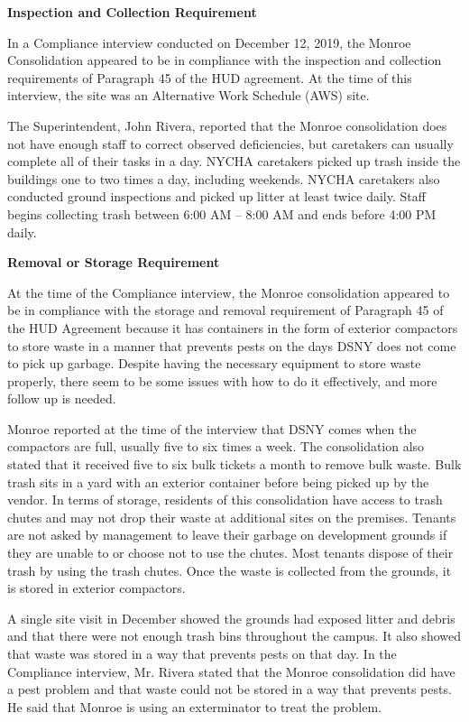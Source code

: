 
\textbf{Inspection and Collection Requirement} 

 

In a Compliance interview conducted on December 12, 2019, the Monroe Consolidation appeared to be in compliance with the inspection and collection requirements of Paragraph 45 of the HUD agreement. At the time of this interview, the site was an Alternative Work Schedule (AWS) site. 

The Superintendent, John Rivera, reported that the Monroe consolidation does not have enough staff to correct observed deficiencies, but caretakers can usually complete all of their tasks in a day. NYCHA caretakers picked up trash inside the buildings one to two times a day, including weekends. NYCHA caretakers also conducted ground inspections and picked up litter at least twice daily. Staff begins collecting trash between 6:00 AM -- 8:00 AM and ends before 4:00 PM daily.

\textbf{Removal or Storage Requirement} 

 

At the time of the Compliance interview, the Monroe consolidation appeared to be in compliance with the storage and removal requirement of Paragraph 45 of the HUD Agreement because it has containers in the form of exterior compactors to store waste in a manner that prevents pests on the days DSNY does not come to pick up garbage. Despite having the necessary equipment to store waste properly, there seem to be some issues with how to do it effectively, and more follow up is needed.

 

Monroe reported at the time of the interview that DSNY comes when the compactors are full, usually five to six times a week. The consolidation also stated that it received five to six bulk tickets a month to remove bulk waste. Bulk trash sits in a yard with an exterior container before being picked up by the vendor. In terms of storage, residents of this consolidation have access to trash chutes and may not drop their waste at additional sites on the premises. Tenants are not asked by management to leave their garbage on development grounds if they are unable to or choose not to use the chutes. Most tenants dispose of their trash by using the trash chutes. Once the waste is collected from the grounds, it is stored in exterior compactors. 

A single site visit in December showed the grounds had exposed litter and debris and that there were not enough trash bins throughout the campus. It also showed that waste was stored in a way that prevents pests on that day. In the Compliance interview, Mr. Rivera stated that the Monroe consolidation did have a pest problem and that waste could not be stored in a way that prevents pests. He said that Monroe is using an exterminator to treat the problem. 

